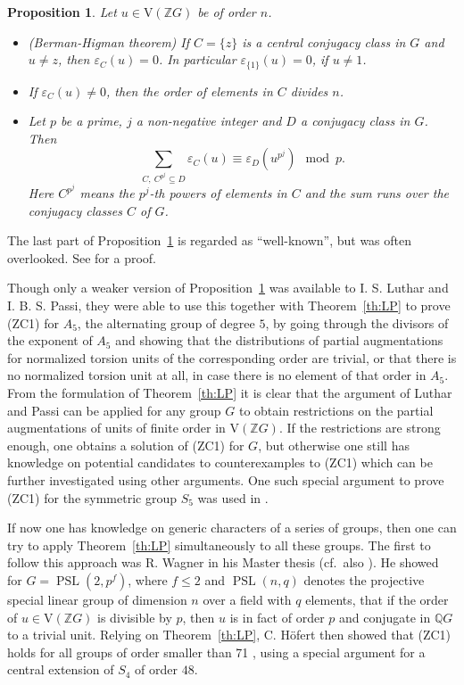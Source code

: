 \documentclass[10pt,a4paper,reqno]{amsart}
\newtheorem{proposition}[theorem]{Proposition}
\theoremstyle{definition}
\theoremstyle{remark}
\newcommand{\PSL}{\operatorname{PSL}}
\newcommand{\V}{\mathrm{V}}
\newcommand{\ZZ}{\mathbb{Z}}
\newcommand{\QQ}{\mathbb{Q}}
\begin{document}
\begin{proposition}\label{prop:partaugs} Let $u \in \V(\ZZ G)$ be of order $n$.
\begin{itemize}
\item[(i)] (Berman-Higman theorem) \cite[Proposition 1.5.1]{JdR16a} If $C= \{z\}$ is a central conjugacy class in $G$ and $u\neq z$, then $\varepsilon_C(u) = 0$. In particular $\varepsilon_{\{1\}}(u) = 0$, if $u \neq 1$.
\item[(ii)] \cite[Theorem 2.3]{HertweckBrauer} If $\varepsilon_C(u) \neq 0$, then the order of elements in $C$ divides $n$.
\item[(iii)] Let $p$ be a prime, $j$ a non-negative integer and $D$ a conjugacy class in $G$. Then
$$\sum_{C, \ C^{p^j} \subseteq D} \varepsilon_C(u) \equiv \varepsilon_D(u^{p^j}) \mod p.$$
Here $C^{p^j}$ means the $p^j$-th powers of elements in $C$ and the sum runs over the conjugacy classes $C$ of $G$.
\end{itemize}
\end{proposition} 

The last part of Proposition~\ref{prop:partaugs} is regarded as ``well-known'', but was often overlooked. See \cite[Proposition 3.1]{HeLPPaper} for a proof.

Though only a weaker version of Proposition~\ref{prop:partaugs} was available to I. S. Luthar and I. B. S. Passi, they were able to use this together with Theorem~\ref{th:LP} to prove (ZC1) for $A_5$, the alternating group of degree $5$, by going through the divisors of the exponent of $A_5$ and showing that the distributions of partial augmentations for normalized torsion units of the corresponding order are trivial, or that there is no normalized torsion unit at all, in case there is no element of that order in $A_5$. 
From the formulation of Theorem~\ref{th:LP} it is clear that the argument of Luthar and Passi can be applied for any group $G$ to obtain restrictions on the partial augmentations of units of finite order in $\V(\ZZ G)$. If the restrictions are strong enough, one obtains a solution of (ZC1) for $G$, but otherwise one still has knowledge on potential candidates to counterexamples to (ZC1) which can be further investigated using other arguments. One such special argument to prove (ZC1) for the symmetric group $S_5$ was used in \cite{LT91}. 

If now one has knowledge on generic characters of a series of groups, then one can try to apply Theorem~\ref{th:LP} simultaneously to all these groups. The first to follow this approach was R. Wagner in his Master thesis \cite{Wag95} (cf.\ also \cite[Section 6]{BHK04}). He showed for $G = \PSL(2,p^f)$, where $f \leqslant 2$ and $\PSL(n,q)$ denotes the projective special linear group of dimension $n$ over a field with $q$ elements, that if the order of $u \in \V(\ZZ G)$ is divisible by $p$, then $u$ is in fact of order $p$ and conjugate in $\QQ G$ to a trivial unit. Relying on Theorem~\ref{th:LP}, C. H{\"o}fert then showed that (ZC1) holds for all groups of order smaller than 71 \cite{BHK04}, using a special argument for a central extension of $S_4$ of order $48$.
\end{document}
